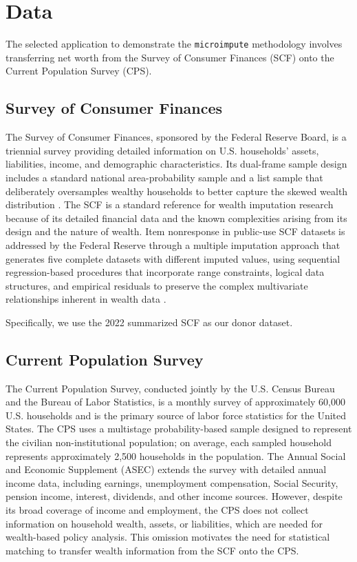 \section{Data}\label{sec:data}

The selected application to demonstrate the \texttt{microimpute} methodology involves transferring net worth from the Survey of Consumer Finances (SCF) onto the Current Population Survey (CPS).

\subsection{Survey of Consumer Finances}

The Survey of Consumer Finances, sponsored by the Federal Reserve Board, is a triennial survey providing detailed information on U.S. households' assets, liabilities, income, and demographic characteristics. Its dual-frame sample design includes a standard national area-probability sample and a list sample that deliberately oversamples wealthy households to better capture the skewed wealth distribution \citep{barcelo2006imputation}. The SCF is a standard reference for wealth imputation research because of its detailed financial data and the known complexities arising from its design and the nature of wealth. Item nonresponse in public-use SCF datasets is addressed by the Federal Reserve through a multiple imputation approach that generates five complete datasets with different imputed values, using sequential regression-based procedures that incorporate range constraints, logical data structures, and empirical residuals to preserve the complex multivariate relationships inherent in wealth data \citep{kennickell1998multiple}. 

Specifically, we use the 2022 summarized SCF as our donor dataset. 

\subsection{Current Population Survey}

The Current Population Survey, conducted jointly by the U.S. Census Bureau and the Bureau of Labor Statistics, is a monthly survey of approximately 60,000 U.S. households and is the primary source of labor force statistics for the United States. The CPS uses a multistage probability-based sample designed to represent the civilian non-institutional population; on average, each sampled household represents approximately 2,500 households in the population. The Annual Social and Economic Supplement (ASEC) extends the survey with detailed annual income data, including earnings, unemployment compensation, Social Security, pension income, interest, dividends, and other income sources. However, despite its broad coverage of income and employment, the CPS does not collect information on household wealth, assets, or liabilities, which are needed for wealth-based policy analysis. This omission motivates the need for statistical matching to transfer wealth information from the SCF onto the CPS.

